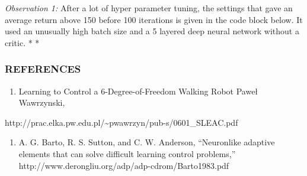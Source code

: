 \documentclass[10pt]{article}
\begin{document}
\emph{Observation 1:} After a lot of hyper parameter tuning, the
settings that gave an average return above 150 before 100 iterations is
given in the code block below. It used an unusually high batch size and
a 5 layered deep neural network without a critic. * *

\subsubsection{REFERENCES}

\begin{enumerate}
\def\labelenumi{\arabic{enumi}.}
\item
  Learning to Control a 6-Degree-of-Freedom Walking Robot Paweł
  Wawrzynski,
\end{enumerate}

http://prac.elka.pw.edu.pl/\textasciitilde{}pwawrzyn/pub-s/0601\_SLEAC.pdf

\begin{enumerate}
\def\labelenumi{\arabic{enumi}.}
\item
  A. G. Barto, R. S. Sutton, and C. W. Anderson, “Neuronlike adaptive
  elements that can solve difficult learning control problems,”
  http://www.derongliu.org/adp/adp-cdrom/Barto1983.pdf
\end{enumerate}
\end{document}

